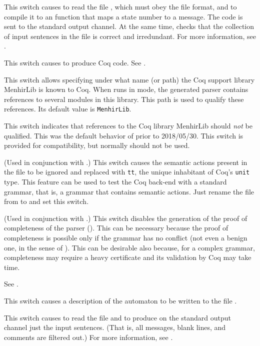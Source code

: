 \documentclass[onecolumn,11pt,nocopyrightspace,preprint]{sigplanconf}
\begin{document}
 This switch causes \menhir to read the
file , which must obey the \messages file format, and to compile
it to an \ocaml function that maps a state number to a message. The \ocaml code
is sent to the standard output channel. At the same time, \menhir checks that
the collection of input sentences in the file  is correct and
irredundant. For more information, see .

\docswitch{\ocoq} This switch causes \menhir to produce Coq code. See .

 This switch allows specifying under what name (or path) the Coq support library
MenhirLib is known to Coq. When \menhir runs in \ocoq mode, the generated
parser contains references to several modules in this library. This path is
used to qualify these references. Its default value is \texttt{MenhirLib}.

\docswitch{\ocoqlibnopath} This switch indicates that references to the Coq library MenhirLib
should \emph{not} be qualified. This was the default behavior of \menhir prior to 2018/05/30.
This switch is provided for compatibility, but normally should not be used.

\docswitch{\ocoqnoactions} (Used in conjunction with \ocoq.) This switch
causes the semantic actions present in the \vy file to be ignored and
replaced with \verb+tt+, the unique inhabitant of Coq's \verb+unit+ type. This
feature can be used to test the Coq back-end with a standard grammar, that is, a
grammar that contains \ocaml semantic actions. Just rename the file from
\mly to \vy and set this switch.

\docswitch{\ocoqnocomplete} (Used in conjunction with \ocoq.) This switch
disables the generation of the proof of completeness of the parser
(). This can be necessary because the proof of completeness is
possible only if the grammar has no conflict (not even a benign one, in the
sense of ). This can be desirable also because, for
a complex grammar, completeness may require a heavy certificate and its
validation by Coq may take time.

\docswitch{\odepend} See .

\docswitch{\odump} This switch causes a description of the automaton
to be written to the file \automaton.

 This switch causes \menhir to
read the \messages file  and to produce on the standard output
channel just the input sentences. (That is, all messages, blank lines, and
comments are filtered out.) For more information, see .
\end{document}

